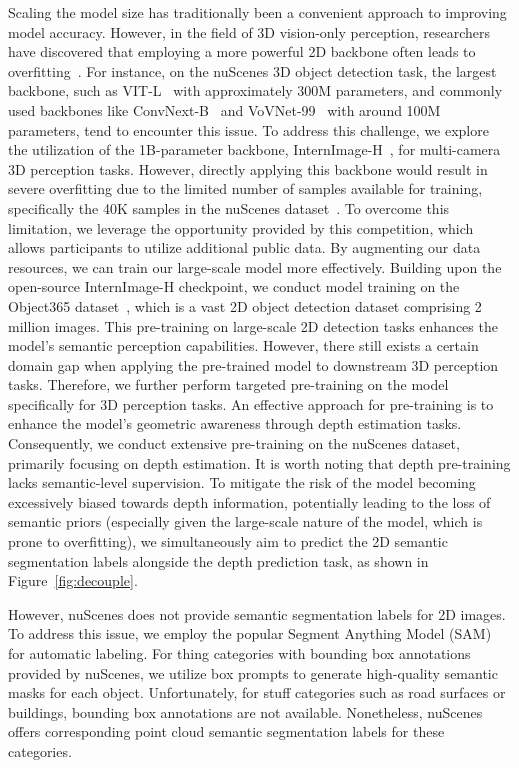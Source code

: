 \documentclass[10pt,twocolumn,letterpaper]{article}
\begin{document}
Scaling the model size has traditionally been a convenient approach to improving model accuracy. However, in the field of 3D vision-only perception, researchers have discovered that employing a more powerful 2D backbone often leads to overfitting~\cite{huang2021bevdet}. For instance, on the nuScenes 3D object detection task, the largest backbone, such as VIT-L~\cite{dosovitskiy2021image} with approximately 300M parameters, and commonly used backbones like ConvNext-B~\cite{liu2022convnet} and VoVNet-99~\cite{lee2019energy} with around 100M parameters, tend to encounter this issue.
To address this challenge, we explore the utilization of the 1B-parameter backbone, InternImage-H~\cite{wang2023internimage}, for multi-camera 3D perception tasks. However, directly applying this backbone would result in severe overfitting due to the limited number of samples available for training, specifically the 40K samples in the nuScenes dataset~\cite{caesar2020nuscenes}. To overcome this limitation, we leverage the opportunity provided by this competition, which allows participants to utilize additional public data. By augmenting our data resources, we can train our large-scale model more effectively.
Building upon the open-source InternImage-H checkpoint, we conduct model training on the Object365 dataset~\cite{shao2019objects365}, which is a vast 2D object detection dataset comprising 2 million images. This pre-training on large-scale 2D detection tasks enhances the model's semantic perception capabilities. However, there still exists a certain domain gap when applying the pre-trained model to downstream 3D perception tasks. Therefore, we further perform targeted pre-training on the model specifically for 3D perception tasks.
An effective approach for pre-training is to enhance the model's geometric awareness through depth estimation tasks. Consequently, we conduct extensive pre-training on the nuScenes dataset, primarily focusing on depth estimation. It is worth noting that depth pre-training lacks semantic-level supervision. To mitigate the risk of the model becoming excessively biased towards depth information, potentially leading to the loss of semantic priors (especially given the large-scale nature of the model, which is prone to overfitting), we simultaneously aim to predict the 2D semantic segmentation labels alongside the depth prediction task, as shown in Figure~\ref{fig:decouple}.

However, nuScenes does not provide semantic segmentation labels for 2D images. To address this issue, we employ the popular Segment Anything Model (SAM)~\cite{kirillov2023segment} for automatic labeling. For thing categories with bounding box annotations provided by nuScenes, we utilize box prompts to generate high-quality semantic masks for each object. Unfortunately, for stuff categories such as road surfaces or buildings, bounding box annotations are not available. Nonetheless, nuScenes offers corresponding point cloud semantic segmentation labels for these categories.
\end{document}
